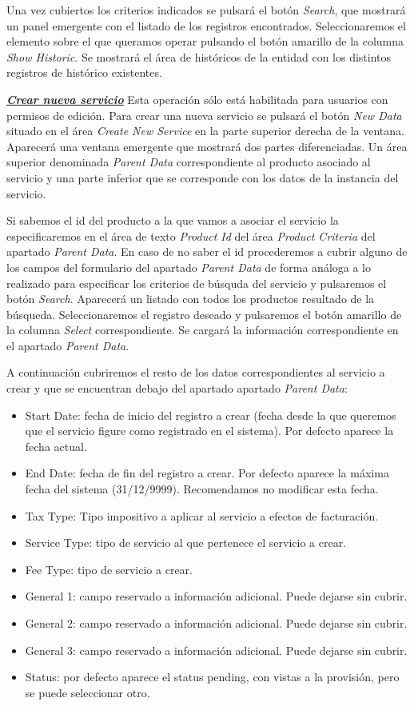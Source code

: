 Una vez cubiertos los criterios indicados se pulsará el botón \emph{Search}, que mostrará un panel emergente con el listado de los registros encontrados. Seleccionaremos el elemento sobre el que queramos operar pulsando el botón amarillo de la columna \emph{Show Historic}. Se mostrará el área de históricos de la entidad con los distintos registros de histórico existentes.


\underline{\textsl{\textbf{Crear nueva servicio}}}\newline
Esta operación sólo está habilitada para usuarios con permisos de edición.
Para crear una nueva servicio se pulsará el botón \textit{New Data} situado en el área \emph{Create New Service} en la parte superior derecha de la ventana. Aparecerá una ventana emergente que mostrará dos partes diferenciadas. Un área superior denominada \emph{Parent Data} correspondiente al producto asociado al servicio y una parte inferior que se corresponde con los datos de la instancia del servicio.

Si sabemos el id del producto a la que vamos a asociar el servicio la especificaremos en el área de texto \emph{Product Id} del área \emph{Product Criteria} del apartado \emph{Parent Data}. En caso de no saber el id procederemos a cubrir alguno de los campos del formulario del apartado \emph{Parent Data} de forma análoga a lo realizado para especificar los criterios de búsquda del servicio y pulsaremos el botón \emph{Search}. Aparecerá un listado con todos los productos resultado de la búsqueda. Seleccionaremos el registro deseado y pulsaremos el botón amarillo de la columna \emph{Select} correspondiente. Se cargará la información correspondiente en el apartado \emph{Parent Data}.

A continuación cubriremos el resto de los datos correspondientes al servicio a crear y que se encuentran debajo del apartado apartado \emph{Parent Data}:

\begin{itemize}
	\item Start Date: fecha de inicio del registro a crear (fecha desde la que queremos que el servicio figure como registrado en el sistema). Por defecto aparece la fecha actual.
	\item End Date: fecha de fin del registro a crear. Por defecto aparece la máxima fecha del sistema (31/12/9999). Recomendamos no modificar esta fecha.
	\item Tax Type: Tipo impositivo a aplicar al servicio a efectos de facturación.
	\item Service Type: tipo de servicio al que pertenece el servicio a crear.	
		\item Fee Type: tipo de servicio a crear. 
	\item General 1: campo reservado a información adicional. Puede dejarse sin cubrir.
	\item General 2: campo reservado a información adicional. Puede dejarse sin cubrir.
	\item General 3: campo reservado a información adicional. Puede dejarse sin cubrir.
	\item Status: por defecto aparece el status pending, con vistas a la provisión, pero se puede seleccionar otro.
\end{itemize}


